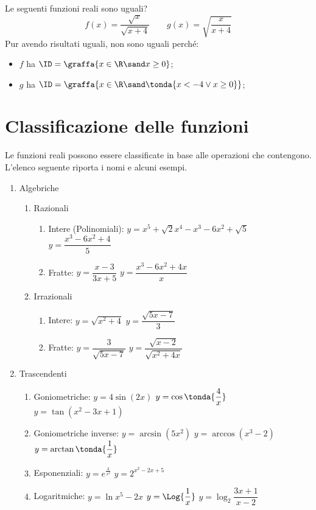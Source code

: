 \begin{esempio}
Le seguenti funzioni reali sono uguali?
\[f(x)=\frac{\sqrt{x}}{\sqrt{x+4}} \qquad g(x)=\sqrt{\frac{x}{x+4}}\]
Pur avendo risultati uguali, non sono uguali perché:
\begin{itemize}[nosep]
\item \(f\) ha 
\(\ID =\graffa{x \in \R \sand x \geq 0}\);
\item \(g\) ha 
\(\ID =\graffa{x \in \R \sand \tonda{x < -4 \lor x \geq 0}}\);
\end{itemize}
\end{esempio}

\section{Classificazione delle funzioni}

Le funzioni reali possono essere classificate in base alle operazioni che 
contengono.
L'elenco seguente riporta i nomi e alcuni esempi.

\begin{enumerate}
\item Algebriche
  \begin{enumerate}[label*=\arabic*.]
  \item Razionali
    \begin{enumerate}[label*=\arabic*.]
    \item Intere (Polinomiali): \quad 
    \(y = x^5 +\sqrt{2}x^4 -x^3-6x^2 +\sqrt{5}\) \qquad 
    \(y = \dfrac{x^3-6x^2 +4}{5}\) 
    \item Fratte: \quad
    \(y = \dfrac{x -3}{3x+5}\) \qquad 
    \(y = \dfrac{x^3-6x^2 +4x}{x}\) 
    \end{enumerate}
  \item Irrazionali
    \begin{enumerate}[label*=\arabic*.]
    \item Intere: \quad 
    \(y = \sqrt{x^2 +4}\) \qquad 
    \(y = \dfrac{\sqrt{5x-7}}{3}\) 
    \item Fratte: \quad
    \(y = \dfrac{3}{\sqrt{5x-7}}\) \qquad 
    \(y = \dfrac{\sqrt{x-2}}{\sqrt{x^2 +4x}}\) 
    \end{enumerate}
  \end{enumerate}
\item Trascendenti
  \begin{enumerate}[label*=\arabic*.]
  \item Goniometriche: \quad
  \(y = 4 \sin(2 x)\) \qquad
  \(y = \cos\tonda{\dfrac{4}{x}}\) \qquad
  \(y = \tan(x^2 -3x +1)\) 
  \item Goniometriche inverse: \quad
  \(y = \arcsin(5 x^2)\) \quad
  \(y = \arccos(x^3-2)\) \quad
  \(y = \arctan\tonda{\dfrac{1}{x}}\) 
  \item Esponenziali: \quad
  \(y = e^{\frac{3}{x^2}}\) \qquad
  \(y = 2^{x^2-2x+5}\) \qquad
  \item Logaritmiche: \quad
  \(y = \ln{x^5-2x}\) \qquad
  \(y = \Log{\dfrac{1}{x}}\) \qquad
  \(y = \log_2{\dfrac{3x+1}{x-2}}\) \qquad
  \end{enumerate}
\end{enumerate}

